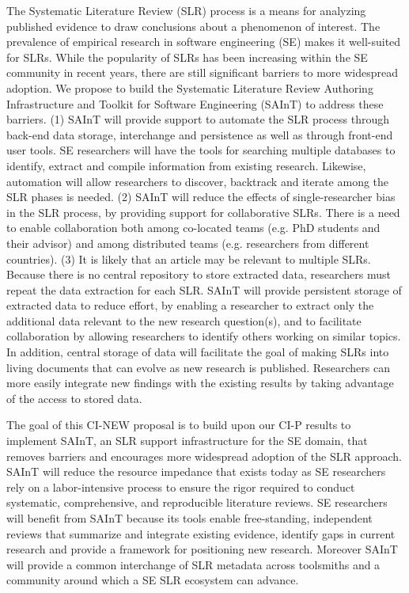 The Systematic Literature Review (SLR) process is a means for analyzing published evidence to draw conclusions about a phenomenon of interest. 
The prevalence of empirical research in software engineering (SE) makes it well-suited for SLRs. 
While the popularity of SLRs has been increasing within the SE community in recent years, there are still significant barriers to more widespread adoption. 
We propose to build the Systematic Literature Review Authoring Infrastructure and Toolkit for Software Engineering (SAInT) to address these barriers. 
(1) SAInT will provide support to automate the SLR process through back-end data storage, interchange and persistence as well as through front-end user tools. 
SE researchers will have the tools for searching multiple databases to identify, extract and compile information from existing research. 
Likewise, automation will allow researchers to discover, backtrack and iterate among the SLR phases is needed. 
(2) SAInT will reduce the effects of single-researcher bias in the SLR process, by providing support for collaborative SLRs.
There is a need to enable collaboration both among co-located teams (e.g. PhD students and their advisor) and among distributed teams (e.g. researchers from different countries). 
(3) It is likely that an article may be relevant to multiple SLRs. 
Because there is no central repository to store extracted data, researchers must repeat the data extraction for each SLR. 
SAInT will provide persistent storage of extracted data to reduce effort, by enabling a researcher to extract only the additional data relevant to the new research question(s), and to facilitate collaboration by allowing researchers to identify others working on similar topics. 
In addition, central storage of data will facilitate the goal of making SLRs into living documents that can evolve as new research is published. 
Researchers can more easily integrate new findings with the existing results by taking advantage of the access to stored data.


The goal of this CI-NEW proposal is to build upon our CI-P results to implement SAInT, an SLR support infrastructure for the SE domain, that removes barriers and encourages more widespread adoption of the SLR approach. 
SAInT will reduce the resource impedance that exists today as SE researchers rely on a labor-intensive process to ensure the rigor required to conduct systematic, comprehensive, and reproducible literature reviews. 
SE researchers will benefit from SAInT because its tools enable free-standing, independent reviews that summarize and integrate existing evidence, identify gaps in current research and provide a framework for positioning new research. 
Moreover SAInT will provide a common interchange of SLR metadata across toolsmiths and a community around which a SE SLR ecosystem can advance.

